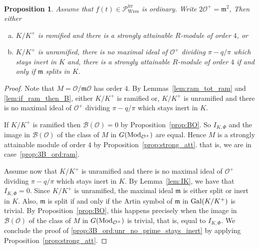 \documentclass[11pt]{amsart}
\def\Gal{\mathop{\rm Gal}\nolimits}
\def\Mod{\mathop{\rm Mod}\nolimits}
\newcommand\cB{\mathcal{B}}
\newcommand\cO{\mathcal{O}}
\newcommand\frm{\mathfrak{m}}
\theoremstyle{plain}
\newtheorem{proposition}[theorem]{Proposition}
\theoremstyle{definition}
\newcommand\PirrB{\mathcal{P}^\mathrm{irr}_\mathrm{Wres}}
\begin{document}
\begin{proposition}\label{prop:3B_ord}
    Assume that $f(t)\in\PirrB$ is ordinary.
    Write $2\cO^+=\frm^2$,
    Then either
    \begin{enumerate}[(a)]
        \item \label{prop:3B_ord:ram} $K/K^+$ is ramified and there is a strongly attainable $R$-module of order $4$, or
        \item \label{prop:3B_ord:unr_no_prime_stays_inert} $K/K^+$ is unramified, there is no maximal ideal of $\cO^+$ dividing $\pi-q/\pi$ which stays inert in $K$ and, there is a strongly attainable $R$-module of order $4$ if and only if $\frm$ splits in $K$.
    \end{enumerate}
\end{proposition}
\begin{proof}
    Note that $M=\cO/\frm\cO$ has order $4$.
    By Lemmas~\ref{lem:ram_tot_ram} and \ref{lem:if_ram_then_B}, either $K/K^+$ is ramified or, $K/K^+$ is unramified and there is no maximal ideal of $\cO^+$ dividing $\pi-q/\pi$ which stays inert in $K$.

    If $K/K^+$ is ramified then $\cB(\cO)=0$ by Proposition~\ref{prop:BO}.
    So $I_{K,\Phi}$ and the image in $\cB(\cO)$ of the class of $M$ in $G(\Mod_{\cO^+})$ are equal.
    Hence $M$ is a strongly attainable module of order $4$ by Proposition~\ref{prop:strong_att}.
    that is, we are in case~\ref{prop:3B_ord:ram}.
    
    Assume now that $K/K^+$ is unramified and there is no maximal ideal of $\cO^+$ dividing $\pi-q/\pi$ which stays inert in $K$.
    By Lemma~\ref{lem:IK}, we have that $I_{K,\Phi} = 0$.
    Since $K/K^+$ is unramified, the maximal ideal $\frm$ is either split or inert in $K$.
    Also, $\frm$ is split if and only if the Artin symbol of $\frm$ in $\Gal(K/K^+)$ is trivial. 
    By Proposition~\ref{prop:BO}, this happens precisely when the image in $\cB(\cO)$ of the class of $M$ in $G(\Mod_{\cO^+})$ is trivial, that is, equal to $I_{K,\Phi}$.
    We conclude the proof of \ref{prop:3B_ord:unr_no_prime_stays_inert} by applying Proposition~\ref{prop:strong_att}.
\end{proof}
\end{document}
